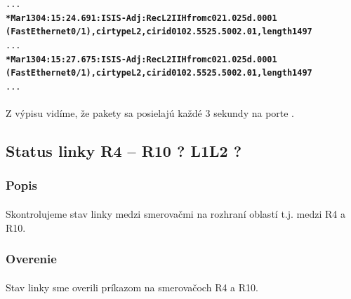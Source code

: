 \documentclass[12pt,twoside,a4paper]{report}
\begin{document}
\noindent
{\selectfont
\begin{small}
\begin{alltt}
...
\textbf{*Mar 13 04:15:24.691: ISIS-Adj: Rec L2 IIH from c021.025d.0001 \\(FastEthernet0/1), cir type L2, cir id 0102.5525.5002.01, length 1497}
...
\textbf{*Mar 13 04:15:27.675: ISIS-Adj: Rec L2 IIH from c021.025d.0001 \\(FastEthernet0/1), cir type L2, cir id 0102.5525.5002.01, length 1497}
...
\end{alltt}
\end{small}
}

\paragraph{}
Z  výpisu vidíme, že  pakety sa posielajú každé 3 sekundy na porte .


\subsection{Status linky R4 – R10 ? L1L2 ?}
\subsubsection{Popis}
\paragraph{}
Skontrolujeme stav linky medzi smerovačmi na rozhraní oblastí t.j. medzi R4 a R10.

\subsubsection{Overenie}
\paragraph{}
Stav linky sme overili príkazom  na smerovačoch R4 a R10.
\end{document}

